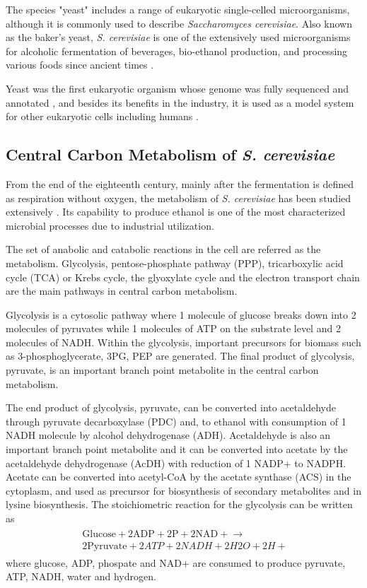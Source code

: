 The species "yeast" includes a range of eukaryotic single-celled microorganisms, although it is commonly used to describe \emph{Saccharomyces cerevisiae}. Also known as the baker's yeast, \emph{S. cerevisiae} is one of the extensively used microorganisms for alcoholic fermentation of beverages, bio-ethanol production, and processing various foods since ancient times \cite{gelinas2009inventions}.

Yeast was the first eukaryotic organism whose genome was fully sequenced and annotated \cite{goffeau1997multidrug}, and besides its benefits in the industry, it is used as a model system for other eukaryotic cells including humans \cite{dujon1996yeast, botstein1997yeast}.

\subsection{Central Carbon Metabolism of \emph{S. cerevisiae}}
From the end of the eighteenth century, mainly after the fermentation is defined as respiration without oxygen, the metabolism of \emph{S. cerevisiae} has been studied extensively \cite{barnett1998history, barnett2000history}. Its capability to produce ethanol is one of the most characterized microbial processes due to industrial utilization.

The set of anabolic and catabolic reactions in the cell are referred as the metabolism. Glycolysis, pentose-phosphate pathway (PPP), tricarboxylic acid cycle (TCA) or Krebs cycle, the glyoxylate cycle and the electron transport chain are the main pathways in central carbon metabolism.

Glycolysis is a cytosolic pathway where 1 molecule of glucose breaks down into 2 molecules of pyruvates while 1 molecules of ATP on the substrate level and 2 molecules of NADH. Within the glycolysis, important precursors for biomass such as 3-phosphoglycerate, 3PG, PEP are generated. The final product of glycolysis, pyruvate, is an important branch point metabolite in the central carbon metabolism.

The end product of glycolysis, pyruvate, can be converted into acetaldehyde through pyruvate decarboxylase (PDC) and, to ethanol with consumption of 1 NADH molecule by alcohol dehydrogenase (ADH). Acetaldehyde is also an important branch point metabolite and it can be converted into acetate by the acetaldehyde dehydrogenase (AcDH) with reduction of 1 NADP+ to NADPH. Acetate can be converted into acetyl-CoA by the acetate synthase (ACS) in the cytoplasm, and used as precursor for biosynthesis of secondary metabolites and in lysine biosynthesis. The stoichiometric reaction for the glycolysis can be written as
\vspace{-1cm}
\begin{align}
  \begin{split}
    \ \text{Glucose} + 2 \text{ADP} + 2 \text{P} + 2 \text{NAD}+ \xrightarrow{} \\
    \ 2 \text{Pyruvate} + 2 {ATP} + 2 {NADH} + 2 H2O + 2{H}+
  \end{split}
\end{align}
where glucose, ADP, phospate and NAD+ are consumed to produce pyruvate, ATP, NADH, water and hydrogen.

